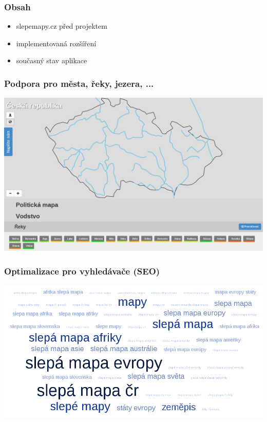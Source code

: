 \documentclass[xcolor=svgnames]{beamer}
\newcommand{\semitransp}[2][35]{\color{fg!#1}#2}
\begin{document}
\begin{frame}
	\frametitle{Obsah}
  \begin{itemize}
  \semitransp[20]{\huge \item slepemapy.cz před projektem}
  \semitransp[100]{ 
  \huge \item implementovaná rozšíření
  }
  \semitransp[20]{\huge \item současný stav aplikace}
  \end{itemize}
\end{frame}
\begin{frame}
	\frametitle{Podpora pro města, řeky, jezera, ...}
   \includegraphics[width=\textwidth]{img/map-rivers.png}
\end{frame}
\begin{frame}
	\frametitle{Optimalizace pro vyhledávače (SEO)}
   \includegraphics[width=\textwidth]{img/keywords-cloud.png}
\end{frame}
\end{document}
